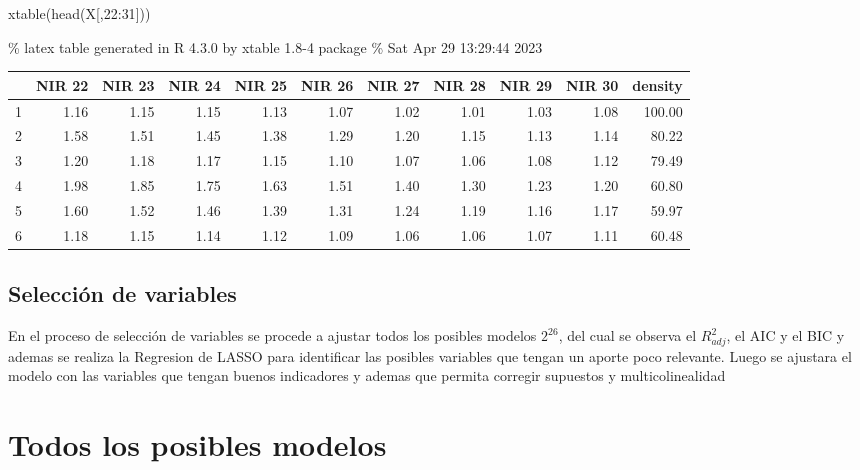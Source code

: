 \documentclass[
]{article}
\newenvironment{Shaded}{\begin{snugshade}}{\end{snugshade}}
\newcommand{\DecValTok}[1]{\textcolor[rgb]{0.00,0.00,0.81}{#1}}
\newcommand{\FunctionTok}[1]{\textcolor[rgb]{0.00,0.00,0.00}{#1}}
\newcommand{\NormalTok}[1]{#1}
\newcommand{\SpecialCharTok}[1]{\textcolor[rgb]{0.00,0.00,0.00}{#1}}
\begin{document}
\begin{Shaded}
\begin{Highlighting}[]
\FunctionTok{xtable}\NormalTok{(}\FunctionTok{head}\NormalTok{(X[,}\DecValTok{22}\SpecialCharTok{:}\DecValTok{31}\NormalTok{]))}
\end{Highlighting}
\end{Shaded}

\% latex table generated in R 4.3.0 by xtable 1.8-4 package \% Sat Apr
29 13:29:44 2023

\begin{table}[ht]
\centering
\begin{tabular}{rrrrrrrrrrr}
  \hline
 & NIR 22 & NIR 23 & NIR 24 & NIR 25 & NIR 26 & NIR 27 & NIR 28 & NIR 29 & NIR 30 & density \\ 
  \hline
1 & 1.16 & 1.15 & 1.15 & 1.13 & 1.07 & 1.02 & 1.01 & 1.03 & 1.08 & 100.00 \\ 
  2 & 1.58 & 1.51 & 1.45 & 1.38 & 1.29 & 1.20 & 1.15 & 1.13 & 1.14 & 80.22 \\ 
  3 & 1.20 & 1.18 & 1.17 & 1.15 & 1.10 & 1.07 & 1.06 & 1.08 & 1.12 & 79.49 \\ 
  4 & 1.98 & 1.85 & 1.75 & 1.63 & 1.51 & 1.40 & 1.30 & 1.23 & 1.20 & 60.80 \\ 
  5 & 1.60 & 1.52 & 1.46 & 1.39 & 1.31 & 1.24 & 1.19 & 1.16 & 1.17 & 59.97 \\ 
  6 & 1.18 & 1.15 & 1.14 & 1.12 & 1.09 & 1.06 & 1.06 & 1.07 & 1.11 & 60.48 \\ 
   \hline
\end{tabular}
\end{table}

\hypertarget{selecciuxf3n-de-variables}{%
\subsection{Selección de variables}\label{selecciuxf3n-de-variables}}

En el proceso de selección de variables se procede a ajustar todos los
posibles modelos \(2^{26}\), del cual se observa el \(R^2_{adj}\), el
AIC y el BIC y ademas se realiza la Regresion de LASSO para identificar
las posibles variables que tengan un aporte poco relevante. Luego se
ajustara el modelo con las variables que tengan buenos indicadores y
ademas que permita corregir supuestos y multicolinealidad

\hypertarget{todos-los-posibles-modelos}{%
\section{Todos los posibles modelos}\label{todos-los-posibles-modelos}}
\end{document}
